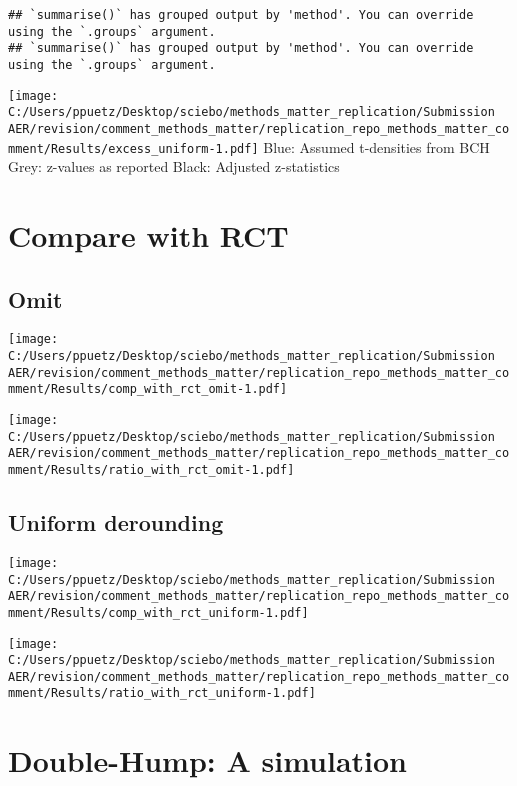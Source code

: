 \documentclass[
]{article}
\begin{document}
\begin{verbatim}
## `summarise()` has grouped output by 'method'. You can override using the `.groups` argument.
## `summarise()` has grouped output by 'method'. You can override using the `.groups` argument.
\end{verbatim}

\texttt{[image: C:/Users/ppuetz/Desktop/sciebo/methods\_matter\_replication/Submission AER/revision/comment\_methods\_matter/replication\_repo\_methods\_matter\_comment/Results/excess\_uniform-1.pdf]}
Blue: Assumed t-densities from BCH Grey: z-values as reported Black:
Adjusted z-statistics

\hypertarget{compare-with-rct}{%
\section{Compare with RCT}\label{compare-with-rct}}

\hypertarget{omit}{%
\subsection{Omit}\label{omit}}

\texttt{[image: C:/Users/ppuetz/Desktop/sciebo/methods\_matter\_replication/Submission AER/revision/comment\_methods\_matter/replication\_repo\_methods\_matter\_comment/Results/comp\_with\_rct\_omit-1.pdf]}

\texttt{[image: C:/Users/ppuetz/Desktop/sciebo/methods\_matter\_replication/Submission AER/revision/comment\_methods\_matter/replication\_repo\_methods\_matter\_comment/Results/ratio\_with\_rct\_omit-1.pdf]}

\hypertarget{uniform-derounding}{%
\subsection{Uniform derounding}\label{uniform-derounding}}

\texttt{[image: C:/Users/ppuetz/Desktop/sciebo/methods\_matter\_replication/Submission AER/revision/comment\_methods\_matter/replication\_repo\_methods\_matter\_comment/Results/comp\_with\_rct\_uniform-1.pdf]}

\texttt{[image: C:/Users/ppuetz/Desktop/sciebo/methods\_matter\_replication/Submission AER/revision/comment\_methods\_matter/replication\_repo\_methods\_matter\_comment/Results/ratio\_with\_rct\_uniform-1.pdf]}

\hypertarget{double-hump-a-simulation}{%
\section{Double-Hump: A simulation}\label{double-hump-a-simulation}}
\end{document}
